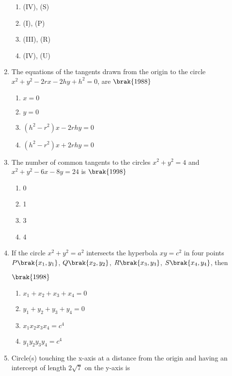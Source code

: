 \begin{enumerate}
\begin{enumerate}[label=(\alph*)] 
 \item (IV), (S)
 \item (I), (P)
 \item (III), (R)    
 \item (IV), (U)

  
  \end{enumerate}
\item The equations of the tangents drawn from the origin to the circle $x^2+y^2-2rx-2hy+h^2=0$, are
    \hfill$\brak{1988}$
    \begin{multicols}{2}
\begin{enumerate}
    \item $x=0$
    \item $y=0$
    \item $(h^2-r^2)x-2rhy=0$
    \item $(h^2-r^2)x+2rhy=0$
\end{enumerate}
\end{multicols}
\item The number of common tangents to the circles $x^2+y^2=4$ and $x^2+y^2-6x-8y=24$ is 
    \hfill$\brak{1998}$
    \begin{multicols}{2}
\begin{enumerate}
    \item 0
    \item 1 
    \item 3
    \item 4
\end{enumerate}
\end{multicols}
\item If the circle $x^2+y^2=a^2$ intersects the hyperbola $xy=c^2$ in four points $P\brak{x_1, y_1}$, $Q\brak{x_2, y_2}$, $R\brak{x_3, y_3}$, $S\brak{x_4, y_4}$, then

    \hfill$\brak{1998}$
\begin{multicols}{2}
\begin{enumerate}
    \item $x_1+x_2+x_3+x_4=0$
    \item $y_1+y_2+y_3+y_4=0$
    \item $x_1x_2x_3x_4=c^4$
    \item $y_1y_2y_3y_4=c^4$

\end{enumerate}
\end{multicols}
\item Circle(s) touching the x-axis at a distance  from the origin and having an intercept of length $2\sqrt{7}$ on the y-axis is 


\end{enumerate}
